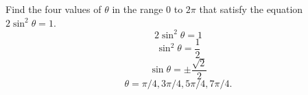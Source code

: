 Find the four values of $\theta$ in the range $0$ to $2\pi$ that satisfy the equation $2\sin^2\theta = 1$.
\[
2\sin^2\theta = 1
\]
\[
\sin^2\theta = \frac{1}{2}
\]
\[
\sin\theta = \pm \frac{\sqrt{2}}{2}
\]
\[
\theta = \pi/4, 3\pi/4, 5\pi/4, 7\pi/4.
\]